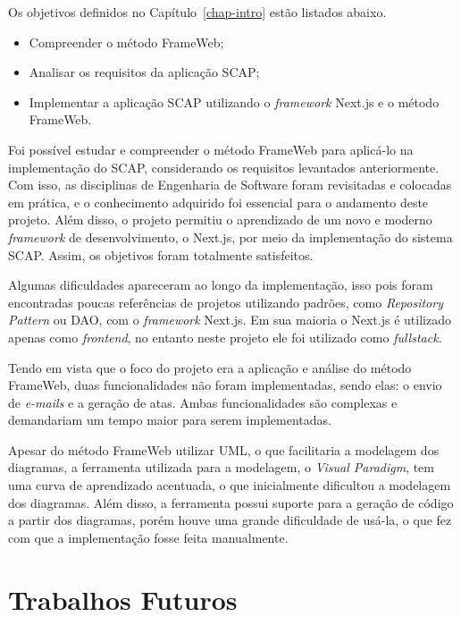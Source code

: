 Os objetivos definidos no Capítulo~\ref{chap-intro} estão listados abaixo.
\begin{itemize}
    \item Compreender o método FrameWeb;
    \item Analisar os requisitos da aplicação SCAP;
    \item Implementar a aplicação SCAP utilizando o \textit{framework} Next.js e o método FrameWeb.
\end{itemize}

Foi possível estudar e compreender o método FrameWeb para aplicá-lo na implementação do SCAP, considerando os requisitos levantados anteriormente.
Com isso, as disciplinas de Engenharia de Software foram revisitadas e colocadas em prática, e o conhecimento adquirido foi essencial para o andamento deste projeto.
Além disso, o projeto permitiu o aprendizado de um novo e moderno \textit{framework} de desenvolvimento, o Next.js, por meio da implementação do sistema SCAP.
Assim, os objetivos foram totalmente satisfeitos.


Algumas dificuldades apareceram ao longo da implementação, isso pois foram encontradas poucas referências
de projetos utilizando padrões, como \textit{Repository Pattern} ou DAO, com o \textit{framework} Next.js.
Em sua maioria o Next.js é utilizado apenas como \textit{frontend}, no entanto neste projeto ele foi utilizado como \textit{fullstack}.

Tendo em vista que o foco do projeto era a aplicação e análise do método FrameWeb, duas funcionalidades não foram implementadas,
sendo elas: o envio de \textit{e-mails} e a geração de atas. Ambas funcionalidades são complexas e demandariam um tempo maior para serem implementadas.


Apesar do método FrameWeb utilizar UML, o que facilitaria a modelagem dos diagramas, a ferramenta utilizada para a modelagem, o \textit{Visual Paradigm}, 
tem uma curva de aprendizado acentuada, o que inicialmente dificultou a modelagem dos diagramas. Além disso, a ferramenta possui suporte para a geração de código
a partir dos diagramas, porém houve uma grande dificuldade de usá-la, o que fez com que a implementação fosse feita manualmente.


\section{Trabalhos Futuros}
\label{sec-conclusoes-trabalhosfuturos}

